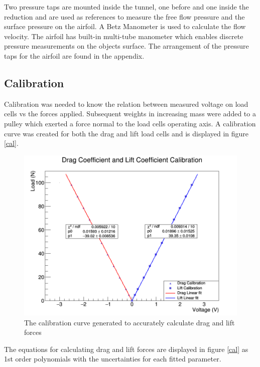 \documentclass[paper=a4, fontsize=11pt, abstract=on]{scrartcl}
\numberwithin{equation}{section}		%
\numberwithin{figure}{section}			%
\numberwithin{table}{section}				%
\begin{document}
 Two pressure taps are mounted inside the tunnel, one before and one inside the reduction and are used as references to measure the free flow pressure and the surface pressure on the airfoil. A Betz Manometer is used to calculate the flow velocity. The airfoil has built-in multi-tube manometer which enables discrete pressure measurements on the objects surface. The arrangement of the pressure taps for the airfoil are found in the appendix.

 

\subsection{Calibration}
Calibration was needed to know the relation between measured voltage on load cells vs the forces applied. Subsequent weights in increasing mass were added to a pulley which exerted a force normal to the load cells operating axis. A calibration curve was created for both the drag and lift load cells and is displayed in figure \ref{cal}.

\begin{figure}[H]
\centering
\includegraphics[width=\linewidth]{cali}
\caption{The calibration curve generated to accurately calculate drag and lift forces}
\label{fig1}
\end{figure}

The equations for calculating drag and lift forces are displayed in figure \ref{cal} as 1st order polynomials with the uncertainties for each fitted parameter.
\end{document}
